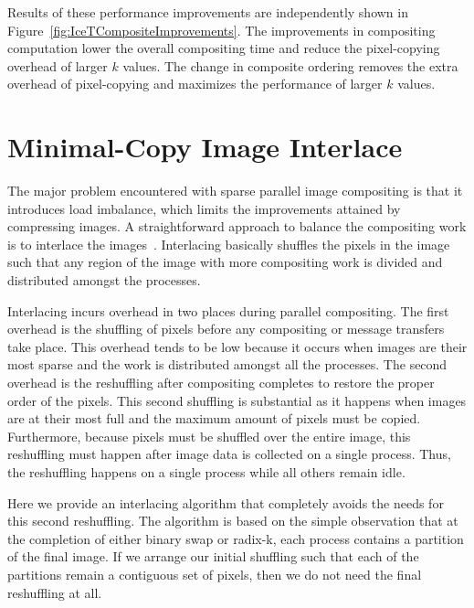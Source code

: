 \documentclass{sig-alternate}
\newcommand*{\lcite}[1]{~\cite{#1}}
\begin{document}
Results of these performance improvements are independently shown in
Figure~\ref{fig:IceTCompositeImprovements}.  The improvements in compositing
computation lower the overall compositing time and reduce the pixel-copying
overhead of larger $k$ values.  The change in composite ordering removes
the extra overhead of pixel-copying and maximizes the performance of larger
$k$ values.

\section{Minimal-Copy Image Interlace}
\label{sec:ImageInterlacing}

The major problem encountered with sparse parallel image compositing is
that it introduces load imbalance, which limits the improvements attained
by compressing images.  A straightforward approach to balance the
compositing work is to interlace the
images\lcite{Molnar1994,Takeuchi2003}.  Interlacing basically shuffles the
pixels in the image such that any region of the image with more compositing
work is divided and distributed amongst the processes.

Interlacing incurs overhead in two places during parallel compositing.  The
first overhead is the shuffling of pixels before any compositing or message
transfers take place.  This overhead tends to be low because it occurs when
images are their most sparse and the work is distributed amongst all the
processes.  The second overhead is the reshuffling after compositing
completes to restore the proper order of the pixels.  This second shuffling
is substantial as it happens when images are at their most full and the
maximum amount of pixels must be copied.  Furthermore, because pixels must
be shuffled over the entire image, this reshuffling must happen after image
data is collected on a single process.  Thus, the reshuffling happens on a
single process while all others remain idle.

Here we provide an interlacing algorithm that completely avoids the needs
for this second reshuffling.  The algorithm is based on the simple
observation that at the completion of either binary swap or radix-k, each
process contains a partition of the final image.  If we arrange our initial
shuffling such that each of the partitions remain a contiguous set of
pixels, then we do not need the final reshuffling at all.
\end{document}
